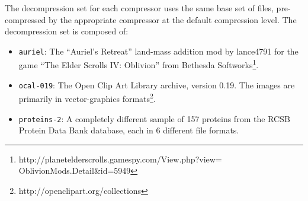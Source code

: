 {\begin{itemize}

\end{itemize}

The decompression set for each compressor uses the same base set of files, pre-compressed by the appropriate compressor at the default compression level.  The decompression set is composed of:
\begin{itemize}
\item {\tt auriel}: The ``Auriel's Retreat'' land-mass addition mod by lance4791 for the game ``The Elder Scrolls IV: Oblivion'' from Bethesda Softworks\footnote{http://planetelderscrolls.gamespy.com/View.php?view=\\ \hspace*{150 pt}OblivionMods.Detail\&id=5949}.




\item {\tt ocal-019}: The Open Clip Art Library archive, version 0.19. The images are primarily in vector-graphics formats\footnote{http://openclipart.org/collections}.


\item {\tt proteins-2}: A completely different sample of 157 proteins from the RCSB Protein Data Bank database, each in 6 different file formats.



\end{itemize}}
